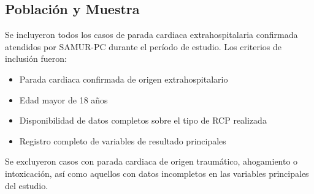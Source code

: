 \documentclass[10pt,a4paper]{article}
\begin{document}
\begin{multicols}{2}
\subsection{Población y Muestra}
Se incluyeron todos los casos de parada cardiaca extrahospitalaria confirmada atendidos por SAMUR-PC durante el período de estudio. Los criterios de inclusión fueron:
\begin{itemize}
\item Parada cardiaca confirmada de origen extrahospitalario
\item Edad mayor de 18 años
\item Disponibilidad de datos completos sobre el tipo de RCP realizada
\item Registro completo de variables de resultado principales
\end{itemize}

Se excluyeron casos con parada cardiaca de origen traumático, ahogamiento o intoxicación, así como aquellos con datos incompletos en las variables principales del estudio.

\end{multicols}
\onecolumn

\end{document}
